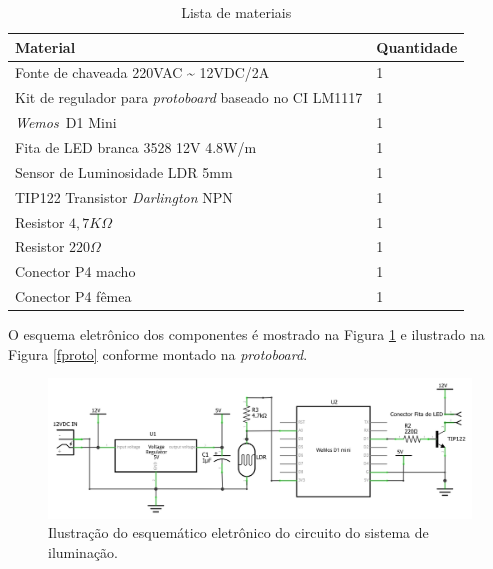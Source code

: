 \begin{table}
    \centering
    \caption{Lista de materiais}
    \label{BOM}
    \begin{tabular}{ll} 
        \hline
        Material                                                       & Quantidade  \\ 
        \hline
        \hline
        Fonte de chaveada 220VAC \textasciitilde{} 12VDC/2A            & 1           \\ 
        \hline
        Kit de regulador para \textit{protoboard} baseado no CI LM1117 & 1           \\ 
        \hline
        \textit{Wemos~}D1 Mini                                         & 1           \\ 
        \hline
        Fita de LED branca 3528 12V 4.8W/m                             & 1           \\ 
        \hline
        Sensor de Luminosidade LDR 5mm                                 & 1           \\ 
        \hline
        TIP122 Transistor \textit{Darlington} NPN                      & 1           \\ 
        \hline
        Resistor $4,7K\Omega$                                          & 1           \\ 
        \hline
        Resistor $220\Omega$                                           & 1           \\ 
        \hline
        Conector P4 macho                                              & 1           \\
        \hline
        Conector P4 fêmea                                              & 1           \\
        \hline
    \end{tabular}
\end{table}

O esquema eletrônico dos componentes é mostrado na Figura \ref{fsch} e ilustrado na Figura \ref{fproto} conforme montado na \textit{protoboard}.

\begin{figure}[ht]
    \begin{center}
    \includegraphics[width=\textwidth]{figuras/fritzsch.PNG}
    \end{center}
    \caption[Ilustração do esquemático eletrônico do circuito do sistema de iluminação.]{Ilustração do esquemático eletrônico do circuito do sistema de iluminação.}
    \label{fsch}
\end{figure}

